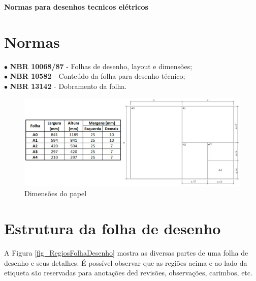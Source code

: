 \documentclass{article}
\begin{document}
\thispagestyle{empty} %


\begin{center}
\textbf{\Large{Normas para desenhos tecnicos elétricos}}    
\end{center}

\vspace{0.5cm}

\section{Normas}

$\bullet$ \hspace{0.1cm} \textbf{NBR 10068/87} - Folhas de desenho, layout e dimensões;\\
$\bullet$ \hspace{0.1cm} \textbf{NBR 10582} - Conteúdo da folha para desenho técnico;\\
$\bullet$ \hspace{0.1cm} \textbf{NBR 13142} - Dobramento da folha.\\

\begin{figure} [H] %
\centering
\includegraphics[scale=0.65]{Fig/Figura_DimensoesDoPapel.png} 
\caption{Dimensões do papel}
\label{fig_DimensPapel}
\end{figure}

\section{Estrutura da folha de desenho}

\hspace{1cm} A Figura \ref{fig_RegiosFolhaDesenho} mostra as diversas partes de uma folha de desenho e seus detalhes. É possível observar que as regiões acima e ao lado da etiqueta são reservadas para anotações ded revisões, observações, carimbos, etc.
\end{document}
